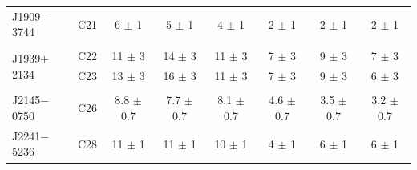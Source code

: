 \begin{landscape}
\begin{table}
\begin{center}
\begin{tabular}{lccccccc}
J1909$-$3744                  & C21  &6    $\pm$ 1   & 5    $\pm$ 1   & 4    $\pm$ 1    & 2    $\pm$ 1   & 2   $\pm$ 1   & 2   $\pm$ 1   \\ 
                              &      &               &                &                 &                &               &               \\
\multirow{2}{*}{J1939$+$2134} & C22  &11   $\pm$ 3   & 14   $\pm$ 3   & 11   $\pm$ 3    & 7    $\pm$ 3   & 9   $\pm$ 3   & 7   $\pm$ 3   \\ 
                              & C23  &13   $\pm$ 3   & 16   $\pm$ 3   & 11   $\pm$ 3    & 7    $\pm$ 3   & 9   $\pm$ 3   & 6   $\pm$ 3   \\ 
                              &      &               &                &                 &                &               &               \\
J2145$-$0750                  & C26  &8.8  $\pm$ 0.7 & 7.7  $\pm$ 0.7 & 8.1  $\pm$ 0.7  & 4.6  $\pm$ 0.7 & 3.5 $\pm$ 0.7 & 3.2 $\pm$ 0.7 \\ 
J2241$-$5236                  & C28  &11   $\pm$ 1   & 11   $\pm$ 1   & 10   $\pm$ 1    & 4    $\pm$ 1   & 6   $\pm$ 1   & 6   $\pm$ 1   \\ 
\hline                                                                                                         
\end{tabular}
\end{center}
\end{table}
\end{landscape}

